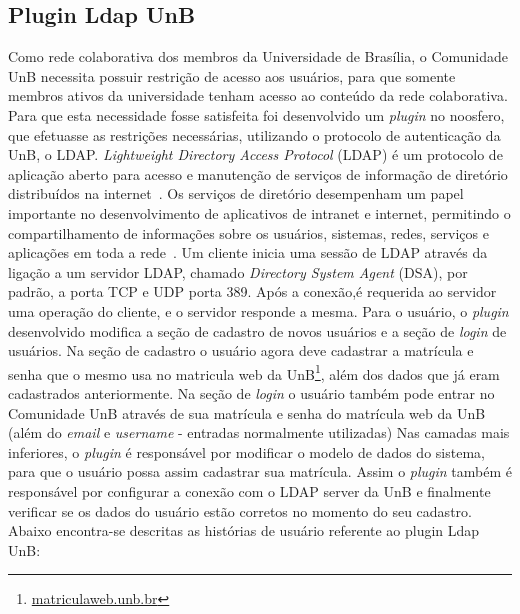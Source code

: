 \subsection{Plugin Ldap UnB}
%
Como rede colaborativa dos membros da Universidade de Brasília, o Comunidade UnB 
necessita possuir restrição de acesso aos usuários, para que somente membros ativos 
da universidade tenham acesso ao conteúdo da rede colaborativa. 
%
Para que esta necessidade fosse satisfeita foi desenvolvido um \textit{plugin} no noosfero, que efetuasse as restrições necessárias, utilizando o protocolo de autenticação da UnB, o LDAP.
%
\textit{Lightweight Directory Access Protocol} (LDAP) é um protocolo de aplicação 
aberto para acesso e manutenção  de serviços de informação de diretório distribuídos 
na internet~\cite{sermersheim2006}.
%
Os serviços de diretório desempenham um papel importante no desenvolvimento de aplicativos 
de intranet e internet, permitindo o compartilhamento de informações sobre os usuários, 
sistemas, redes, serviços e aplicações em toda a rede~\cite{oracle2000}.
%
Um cliente inicia uma sessão de LDAP através da ligação a um servidor LDAP, chamado 
\textit{Directory System Agent} (DSA), por padrão, a porta TCP e UDP porta 389. Após 
a conexão,é requerida ao servidor uma operação do cliente, e o servidor responde a 
mesma. 
%
Para o usuário, o \textit{plugin} desenvolvido modifica a seção de cadastro de novos usuários e a seção de \textit{login} de usuários. Na seção de cadastro o usuário agora deve cadastrar a matrícula e senha que o mesmo usa no matricula web da UnB\footnote{\url{matriculaweb.unb.br}}, além dos dados que já eram cadastrados anteriormente. Na seção de \textit{login} o usuário também pode entrar no Comunidade UnB através de sua matrícula e senha do matrícula web da UnB (além do \textit{email} e \textit{username} 
- entradas normalmente utilizadas)
%
Nas camadas mais inferiores, o \textit{plugin} é responsável por modificar o modelo de dados do sistema, para que o usuário possa assim cadastrar sua matrícula. Assim o \textit{plugin} também é responsável por configurar a conexão com o LDAP server da UnB e finalmente verificar se os dados do usuário estão corretos no momento do seu cadastro. Abaixo encontra-se descritas as histórias de usuário referente ao {plugin} Ldap UnB:
